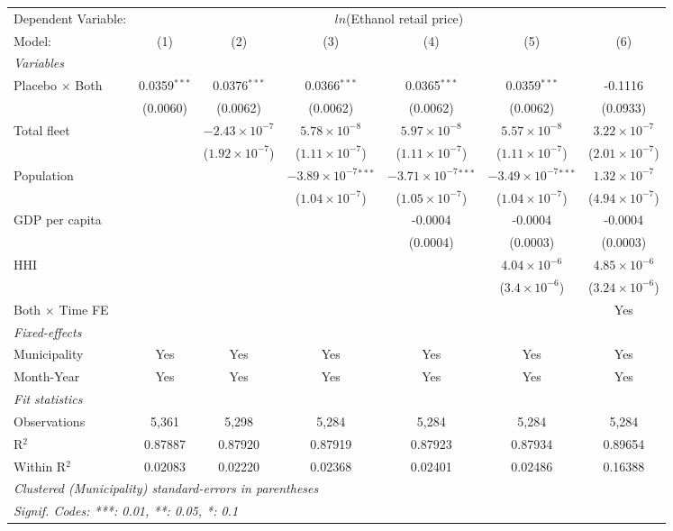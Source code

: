 \documentclass[
]{article}
\begin{document}
\begin{tabular}{lcccccc}
\tabularnewline\midrule\midrule
Dependent Variable:&\multicolumn{6}{c}{$ln$(Ethanol retail price)}\\
Model:&(1) & (2) & (3) & (4) & (5) & (6)\\
\midrule \emph{Variables}&   &   &   &   &   &  \\
Placebo $\times $ Both & 0.0359$^{***}$ & 0.0376$^{***}$ & 0.0366$^{***}$ & 0.0365$^{***}$ & 0.0359$^{***}$ & -0.1116\\
  &(0.0060) & (0.0062) & (0.0062) & (0.0062) & (0.0062) & (0.0933)\\
Total fleet &    & $-2.43\times 10^{-7}$ & $5.78\times 10^{-8}$ & $5.97\times 10^{-8}$ & $5.57\times 10^{-8}$ & $3.22\times 10^{-7}$\\
  &   & ($1.92\times 10^{-7}$) & ($1.11\times 10^{-7}$) & ($1.11\times 10^{-7}$) & ($1.11\times 10^{-7}$) & ($2.01\times 10^{-7}$)\\
Population &    &    & $-3.89\times 10^{-7}$$^{***}$ & $-3.71\times 10^{-7}$$^{***}$ & $-3.49\times 10^{-7}$$^{***}$ & $1.32\times 10^{-7}$\\
  &   &    & ($1.04\times 10^{-7}$) & ($1.05\times 10^{-7}$) & ($1.04\times 10^{-7}$) & ($4.94\times 10^{-7}$)\\
GDP per capita &    &    &    & -0.0004 & -0.0004 & -0.0004\\
  &   &    &    & (0.0004) & (0.0003) & (0.0003)\\
HHI &    &    &    &    & $4.04\times 10^{-6}$ & $4.85\times 10^{-6}$\\
  &   &    &    &    & ($3.4\times 10^{-6}$) & ($3.24\times 10^{-6}$)\\
Both $\times$ Time FE &  &  &  &  &  & Yes\\
\midrule \emph{Fixed-effects}&   &   &   &   &   &  \\
Municipality & Yes & Yes & Yes & Yes & Yes & Yes\\
Month-Year & Yes & Yes & Yes & Yes & Yes & Yes\\
\midrule \emph{Fit statistics}&  & & & & & \\
Observations & 5,361&5,298&5,284&5,284&5,284&5,284\\
R$^2$ & 0.87887&0.87920&0.87919&0.87923&0.87934&0.89654\\
Within R$^2$ & 0.02083&0.02220&0.02368&0.02401&0.02486&0.16388\\
\midrule\midrule\multicolumn{7}{l}{\emph{Clustered (Municipality) standard-errors in parentheses}}\\
\multicolumn{7}{l}{\emph{Signif. Codes: ***: 0.01, **: 0.05, *: 0.1}}\\
\end{tabular}
\end{document}
